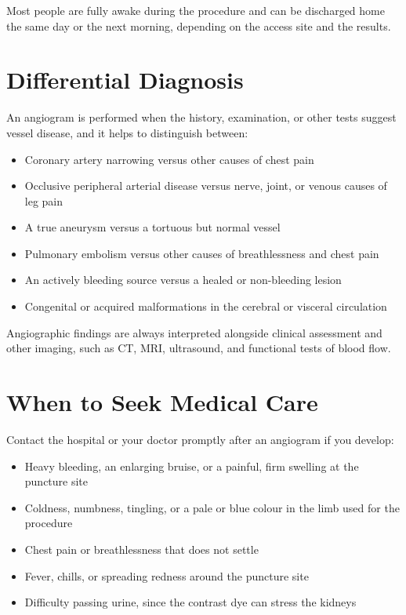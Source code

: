 Most people are fully awake during the procedure and can be discharged home the same day or the next morning, depending on the access site and the results.

\section*{Differential Diagnosis}
An angiogram is performed when the history, examination, or other tests suggest vessel disease, and it helps to distinguish between:

\begin{itemize}
    \item Coronary artery narrowing versus other causes of chest pain
    \item Occlusive peripheral arterial disease versus nerve, joint, or venous causes of leg pain
    \item A true aneurysm versus a tortuous but normal vessel
    \item Pulmonary embolism versus other causes of breathlessness and chest pain
    \item An actively bleeding source versus a healed or non-bleeding lesion
    \item Congenital or acquired malformations in the cerebral or visceral circulation
\end{itemize}

Angiographic findings are always interpreted alongside clinical assessment and other imaging, such as CT, MRI, ultrasound, and functional tests of blood flow.

\section*{When to Seek Medical Care}
Contact the hospital or your doctor promptly after an angiogram if you develop:

\begin{itemize}
    \item Heavy bleeding, an enlarging bruise, or a painful, firm swelling at the puncture site
    \item Coldness, numbness, tingling, or a pale or blue colour in the limb used for the procedure
    \item Chest pain or breathlessness that does not settle
    \item Fever, chills, or spreading redness around the puncture site
    \item Difficulty passing urine, since the contrast dye can stress the kidneys
\end{itemize}

